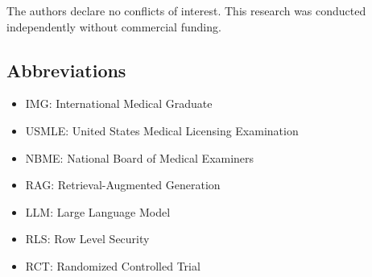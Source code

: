 The authors declare no conflicts of interest. This research was conducted independently without commercial funding.

\subsection*{Abbreviations}

\begin{itemize}
    \item IMG: International Medical Graduate
    \item USMLE: United States Medical Licensing Examination
    \item NBME: National Board of Medical Examiners
    \item RAG: Retrieval-Augmented Generation
    \item LLM: Large Language Model
    \item RLS: Row Level Security
    \item RCT: Randomized Controlled Trial
\end{itemize}
